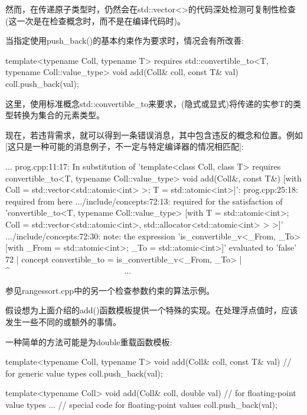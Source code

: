 然而，在传递原子类型时，仍然会在std::vector<>的代码深处检测可复制性检查(这一次是在检查概念时，而不是在编译代码时)。

当指定使用push\_back()的基本约束作为要求时，情况会有所改善:

\begin{cpp}
template<typename Coll, typename T>
requires std::convertible_to<T, typename Coll::value_type>
void add(Coll& coll, const T& val)
{
	coll.push_back(val);
}
\end{cpp}

这里，使用标准概念std::convertible\_to来要求，(隐式或显式)将传递的实参T的类型转换为集合的元素类型。

现在，若违背需求，就可以得到一条错误消息，其中包含违反的概念和位置。例如[这只是一种可能的消息例子，不一定与特定编译器的情况相匹配]:

{\footnotesize
\begin{shell}
...
prog.cpp:11:17: In substitution of ’template<class Coll, class T>
                 requires convertible_to<T, typename Coll::value_type>
                 void add(Coll&, const T&)
                [with Coll = std::vector<std::atomic<int> >; T = std::atomic<int>]’:
prog.cpp:25:18: required from here
.../include/concepts:72:13: required for the satisfaction of
                 ’convertible_to<T, typename Coll::value_type>
                  [with T = std::atomic<int>;
                      Coll = std::vector<std::atomic<int>,
                                              std::allocator<std::atomic<int> > >]’
.../include/concepts:72:30: note: the expression ’is_convertible_v<_From, _To>
                      [with _From = std::atomic<int>; _To = std::atomic<int>]’
                      evaluated to ’false’
    72 | concept convertible_to = is_convertible_v<_From, _To>
        |                                    ^~~~~~~~~~~~~~~~~~~~~~~~~~~~
...
\end{shell}
}

参见rangessort.cpp中的另一个检查参数约束的算法示例。


假设想为上面介绍的add()函数模板提供一个特殊的实现。在处理浮点值时，应该发生一些不同的或额外的事情。

一种简单的方法可能是为double重载函数模板:

\begin{cpp}
template<typename Coll, typename T>
void add(Coll& coll, const T& val) // for generic value types
{
	coll.push_back(val);
}

template<typename Coll>
void add(Coll& coll, double val) // for floating-point value types
{
	... // special code for floating-point values
	coll.push_back(val);
}
\end{cpp}

